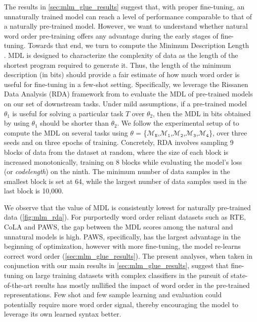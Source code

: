\documentclass[letterpaper, 12pt]{report}
\newcommand{\OR}{$\mathcal{M}_{\texttt{N}}$}
\newcommand{\RI}{$\mathcal{M}_{\texttt{1}}$}
\newcommand{\RII}{$\mathcal{M}_{\texttt{2}}$}
\newcommand{\RIII}{$\mathcal{M}_{\texttt{3}}$}
\newcommand{\RIV}{$\mathcal{M}_{\texttt{4}}$}
\begin{document}
The results in \autoref{sec:mlm_glue_results} suggest that, with proper fine-tuning, an unnaturally trained model can reach a level of performance comparable to that of a naturally pre-trained model. However, we want to understand whether natural word order pre-training offers any advantage during the early stages of fine-tuning. Towards that end, we turn to compute the Minimum Description Length \cite[MDL; ][]{rissanen1984universal}. MDL is designed to characterize the complexity of data as the length of the shortest program required to generate it. Thus, the length of the minimum description (in bits) should provide a fair estimate of how much word order is useful for fine-tuning in a few-shot setting. Specifically, we leverage the Rissanen Data Analysis (RDA) framework from \citet{perez2021} to evaluate the MDL of pre-trained models on our set of downstream tasks. Under mild assumptions, if a pre-trained model $\theta_1$ is useful for solving a particular task $T$ over $\theta_2$, then the MDL in bits obtained by using $\theta_1$ should be shorter than $\theta_2$.
We follow the experimental setup of \citeauthor{perez2021} to compute the MDL on several tasks using $\theta$ = \{\OR,\RI,\RII,\RIII,\RIV\}, over three seeds and on three epochs of training. Concretely, RDA involves sampling 9 blocks of data from the dataset at random, where the size of each block is increased monotonically, training on 8 blocks while evaluating the model's loss (or \textit{codelength}) on the ninth. The minimum number of data samples in the smallest block is set at 64, while the largest number of data samples used in the last block is 10,000.

We observe that the value of MDL is consistently lowest for naturally pre-trained data (\autoref{fig:mlm_rda}). For purportedly word order reliant datasets such as RTE, CoLA and PAWS, the gap between the MDL scores among the natural and unnatural models is high. PAWS, specifically, has the largest advantage in the beginning of optimization, however with more fine-tuning, the model re-learns correct word order (\autoref{sec:mlm_glue_results}). The present analyses, when taken in conjunction with our main results in \autoref{sec:mlm_glue_results}, suggest that fine-tuning on large training datasets with complex classifiers in the pursuit of state-of-the-art results has mostly nullified the impact of word order in the pre-trained representations. Few shot \cite{bansal-etal-2020-learning} and few sample \cite{zhang2021a} learning and evaluation could potentially require more word order signal, thereby encouraging the model to leverage its own learned syntax better.
\end{document}
